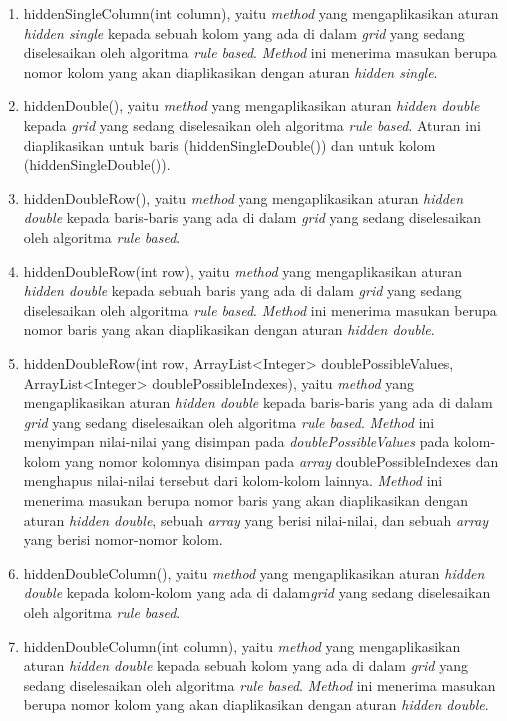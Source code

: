 \begin{enumerate}
\item hiddenSingleColumn(int column), yaitu \textit{method} yang mengaplikasikan aturan \textit{hidden single} kepada sebuah kolom yang ada di dalam \textit{grid} yang sedang diselesaikan oleh algoritma \textit{rule based}. \textit{Method} ini menerima masukan berupa nomor kolom yang akan diaplikasikan dengan aturan \textit{hidden single}.
\item hiddenDouble(), yaitu \textit{method} yang mengaplikasikan aturan \textit{hidden double} kepada \textit{grid} yang sedang diselesaikan oleh algoritma \textit{rule based}. Aturan ini diaplikasikan untuk baris (hiddenSingleDouble()) dan untuk kolom (hiddenSingleDouble()).
\item hiddenDoubleRow(), yaitu \textit{method} yang mengaplikasikan aturan \textit{hidden double} kepada baris-baris yang ada di dalam \textit{grid} yang sedang diselesaikan oleh algoritma \textit{rule based}.
\item hiddenDoubleRow(int row), yaitu \textit{method} yang mengaplikasikan aturan \textit{hidden double} kepada sebuah baris yang ada di dalam \textit{grid} yang sedang diselesaikan oleh algoritma \textit{rule based}. \textit{Method} ini menerima masukan berupa nomor baris yang akan diaplikasikan dengan aturan \textit{hidden double}.
\item hiddenDoubleRow(int row, ArrayList<Integer> doublePossibleValues, ArrayList<Integer> doublePossibleIndexes), yaitu \textit{method} yang mengaplikasikan aturan \textit{hidden double} kepada baris-baris yang ada di dalam \textit{grid} yang sedang diselesaikan oleh algoritma \textit{rule based}. \textit{Method} ini menyimpan nilai-nilai yang disimpan pada \textit{doublePossibleValues} pada kolom-kolom yang nomor kolomnya disimpan pada \textit{array} doublePossibleIndexes dan menghapus nilai-nilai tersebut dari kolom-kolom lainnya. \textit{Method} ini menerima masukan berupa nomor baris yang akan diaplikasikan dengan aturan \textit{hidden double}, sebuah \textit{array} yang berisi nilai-nilai, dan sebuah \textit{array} yang berisi nomor-nomor kolom.
\item hiddenDoubleColumn(), yaitu \textit{method} yang mengaplikasikan aturan \textit{hidden double} kepada kolom-kolom yang ada di dalam\textit{grid} yang sedang diselesaikan oleh algoritma \textit{rule based}.
\item hiddenDoubleColumn(int column), yaitu \textit{method} yang mengaplikasikan aturan \textit{hidden double} kepada sebuah kolom yang ada di dalam \textit{grid} yang sedang diselesaikan oleh algoritma \textit{rule based}. \textit{Method} ini menerima masukan berupa nomor kolom yang akan diaplikasikan dengan aturan \textit{hidden double}.

\end{enumerate}
